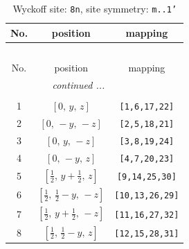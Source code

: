 \documentclass[fleqn,8pt]{jsarticle}
\begin{document}
\begin{longtable}{ccc}
\caption{Wyckoff site: {\tt 8n}, site symmetry: {\tt m..1'}}
 \\
 \hline \hline
No. & position & mapping \\ \hline \endfirsthead

\multicolumn{2}{l}{\tablename\ \thetable{}} \\
 \hline \hline
No. & position & mapping \\ \hline \endhead

 \hline \hline
\multicolumn{2}{r}{\footnotesize\it continued ...} \\ \endfoot

 \hline \hline
\multicolumn{2}{r}{} \\ \endlastfoot

1 & $\left[ 0,\, y,\, z \right]$ & {\tt [1,6,17,22]} \\ \hline
2 & $\left[ 0,\, - y,\, - z \right]$ & {\tt [2,5,18,21]} \\ \hline
3 & $\left[ 0,\, y,\, - z \right]$ & {\tt [3,8,19,24]} \\ \hline
4 & $\left[ 0,\, - y,\, z \right]$ & {\tt [4,7,20,23]} \\ \hline
5 & $\left[ \frac{1}{2},\, y + \frac{1}{2},\, z \right]$ & {\tt [9,14,25,30]} \\ \hline
6 & $\left[ \frac{1}{2},\, \frac{1}{2} - y,\, - z \right]$ & {\tt [10,13,26,29]} \\ \hline
7 & $\left[ \frac{1}{2},\, y + \frac{1}{2},\, - z \right]$ & {\tt [11,16,27,32]} \\ \hline
8 & $\left[ \frac{1}{2},\, \frac{1}{2} - y,\, z \right]$ & {\tt [12,15,28,31]} \\
\end{longtable}
\renewcommand{\arraystretch}{1.2}
\end{document}

